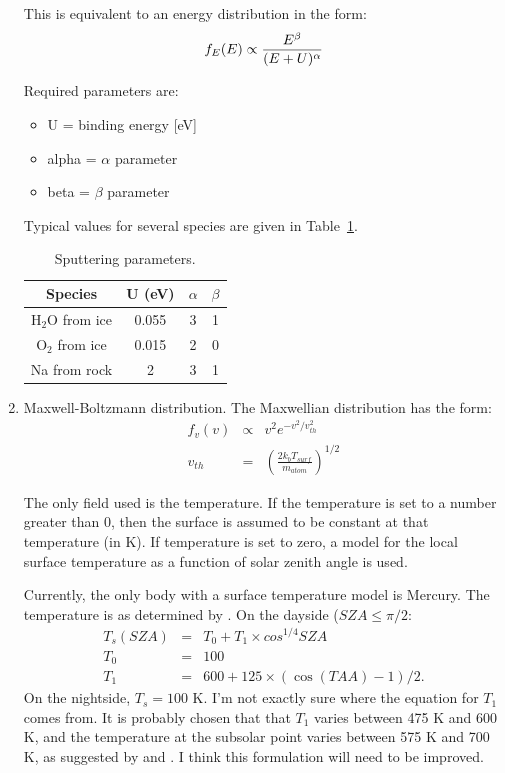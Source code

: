 \documentclass[11pt]{article}
\begin{document}
\begin{enumerate}
This is equivalent to an energy distribution in the form:
\begin{equation}
f_E(E) \propto \frac{E^\beta}{(E + U)^\alpha} \\
\end{equation}

Required parameters are:
\begin{itemize}
\item U = binding energy [eV]
\item alpha = $\alpha$ parameter
\item beta = $\beta$ parameter
\end{itemize}

Typical values for several species are given in Table~\ref{table:sputparam}.

\begin{table}
\caption{Sputtering parameters.} \begin{center}
\begin{tabular}{cccc} \hline
Species & U (eV) & $\alpha$ & $\beta$ \\ \hline
H$_2$O from ice & 0.055 & 3 & 1 \\
O$_2$ from ice & 0.015 & 2 & 0 \\
Na from rock & 2 & 3 & 1 \\
\end{tabular} \end{center}
\label{table:sputparam}
\end{table}

\item Maxwell-Boltzmann distribution. The Maxwellian distribution has the form:
\begin{eqnarray}
f_v(v) & \propto & v^2 e^{-v^2/v_{th}^2} \\
v_{th} & = & \left(\frac{2k_b T_{surf}}{m_{atom}}\right)^{1/2}
\end{eqnarray}

The only field used is the temperature. If the temperature is set to a number
greater than 0,
then the surface is assumed to be constant at that temperature (in K). If 
temperature
is set to zero, a model for the local surface temperature as a function of
solar zenith angle is used.

Currently, the only body with a surface temperature model is Mercury. The
temperature is as determined by \cite{leblanc2003}. On the dayside ($SZA \leq
\pi/2$: 
\begin{eqnarray}
T_s(SZA) & = & T_0 + T_1 \times cos^{1/4} SZA \\
T_0 & = & 100 \\
T_1 & = & 600 + 125 \times (\cos(TAA)-1)/2.
\end{eqnarray}
On the nightside, $T_s = 100$ K.
I'm not exactly sure where the equation for $T_1$ comes from. It is probably
chosen that that $T_1$ varies between 475 K and 600 K, and the temperature at
the subsolar point varies between 575 K and 700 K, as suggested by
\cite{leblanc2003} and \cite{butler1997}. I think this formulation will need to
be improved.


\end{enumerate}
\end{document}
